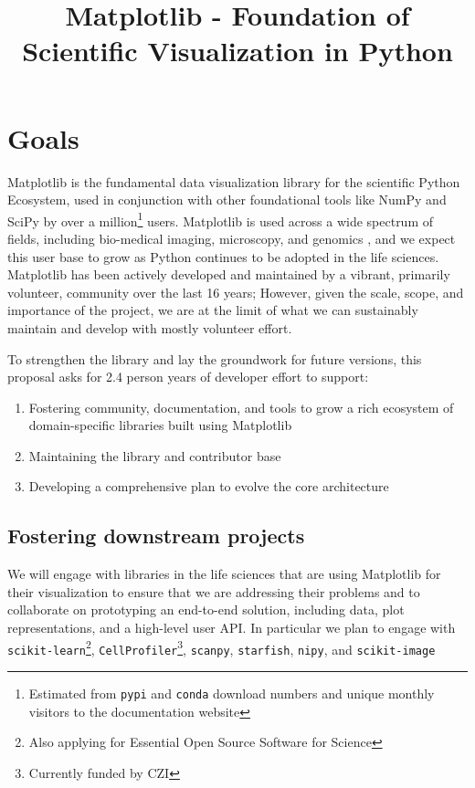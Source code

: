 \documentclass[11pt,letterpaper]{article}  %
\begin{document}
\title{Matplotlib - Foundation of Scientific Visualization in Python}
\author{}
\maketitle

\section{Goals}

Matplotlib\cite{Hunter:2007} is the fundamental 
data visualization library for the scientific Python Ecosystem, used 
in conjunction with other foundational tools like NumPy and
SciPy \cite{Jones2001} by over a million\footnote{Estimated from \texttt{pypi} 
and \texttt{conda} download numbers and unique monthly visitors to the documentation website} users.  
Matplotlib is used across a wide spectrum of fields, including bio-medical imaging,
microscopy, and genomics \cite{Carpenter2006,Wolf2018,10.7717/peerj.453,
  Segata2011,10.1371/journal.pgen.1000695,HASHIMSHONY2012666,
  10.1093/bioinformatics/bts480,Carlile2014,Laganowsky2014,Jiangaac9462,
  10.3389/fninf.2014.00014}, and we expect this user base to grow as Python 
  continues to be adopted in the life sciences. %
Matplotlib has been actively developed and maintained by a vibrant,
primarily volunteer, community over the last 16 years; However, given
the scale, scope, and importance of the project, we are at the limit
of what we can sustainably maintain and develop with mostly
volunteer effort.

To strengthen the library and lay the groundwork for future versions, this proposal asks for 2.4 person years of developer effort to support:


\begin{enumerate}[label=\alph*),noitemsep]
  \item Fostering community, documentation, and tools to grow a rich ecosystem of domain-specific libraries built using Matplotlib 
  \item Maintaining the library and contributor base
  \item Developing a comprehensive plan to evolve the core architecture
\end{enumerate}

\subsection{Fostering downstream projects}
\label{sec:downstream}
We will engage with libraries in the life sciences that are using Matplotlib for their visualization to ensure that we are addressing their problems and to collaborate on prototyping an end-to-end solution, including data, plot representations, and a high-level user API.  
In particular we plan to engage with \texttt{scikit-learn}\footnote{Also applying for Essential Open Source
Software for Science}, \texttt{CellProfiler}\footnote{Currently funded
by CZI\label{f:czi}}, \texttt{scanpy}, \texttt{starfish}, \texttt{nipy}, and
\texttt{scikit-image} \cite{10.7717/peerj.453,Carpenter2006, Wolf2018}
\end{document}
